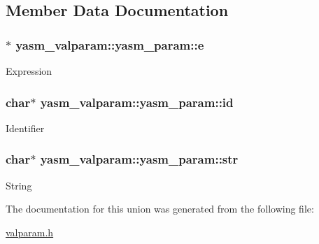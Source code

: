 \subsection{Member Data Documentation}
\hypertarget{unionyasm__valparam_1_1yasm__param_a4a4970b5951111eebeb7cc3a74357b4c}{
\subsubsection[{e}]{$\ast$ yasm\-\_\-valparam\-::yasm\-\_\-param\-::e}}\label{unionyasm__valparam_1_1yasm__param_a4a4970b5951111eebeb7cc3a74357b4c}
Expression \hypertarget{unionyasm__valparam_1_1yasm__param_a4141b7871748921850acc6997b20ae7b}{
\subsubsection[{id}]{\setlength{\rightskip}{0pt plus 5cm}char$\ast$ yasm\-\_\-valparam\-::yasm\-\_\-param\-::id}}\label{unionyasm__valparam_1_1yasm__param_a4141b7871748921850acc6997b20ae7b}
Identifier \hypertarget{unionyasm__valparam_1_1yasm__param_a0021321bc7cf76e737a0ccb9570327d7}{
\subsubsection[{str}]{\setlength{\rightskip}{0pt plus 5cm}char$\ast$ yasm\-\_\-valparam\-::yasm\-\_\-param\-::str}}\label{unionyasm__valparam_1_1yasm__param_a0021321bc7cf76e737a0ccb9570327d7}
String 

The documentation for this union was generated from the following file\-:\begin{DoxyCompactItemize}
\item 
\hyperlink{valparam_8h}{valparam.\-h}\end{DoxyCompactItemize}

